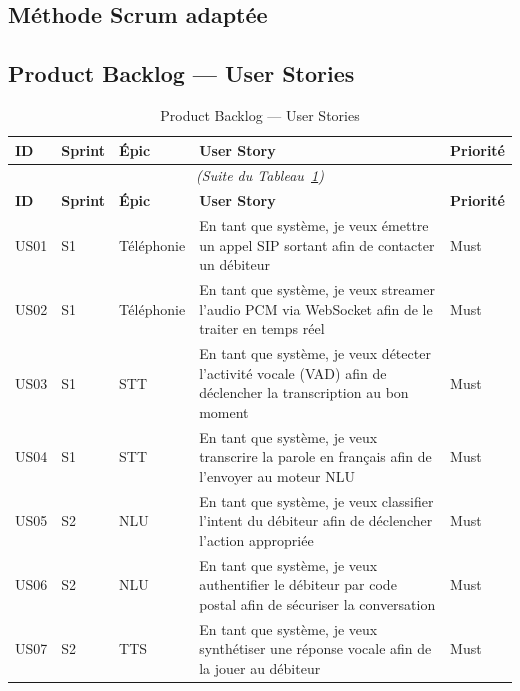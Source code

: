 \subsection{Méthode Scrum adaptée}


\subsection{Product Backlog — User Stories}


\begin{longtable}{lllp{6cm}l}
  \caption{Product Backlog — User Stories} \label{tab:backlog} \\
  \toprule
  \textbf{ID} & \textbf{Sprint} & \textbf{Épic} & \textbf{User Story} & \textbf{Priorité} \\
  \midrule
  \endfirsthead
  \multicolumn{5}{c}{\textit{(Suite du Tableau~\ref{tab:backlog})}} \\
  \toprule
  \textbf{ID} & \textbf{Sprint} & \textbf{Épic} & \textbf{User Story} & \textbf{Priorité} \\
  \midrule
  \endhead
  \bottomrule
  \endfoot
  US01 & S1 & Téléphonie  & En tant que système, je veux émettre un appel SIP sortant afin de contacter un débiteur & Must \\
  US02 & S1 & Téléphonie  & En tant que système, je veux streamer l'audio PCM via WebSocket afin de le traiter en temps réel & Must \\
  US03 & S1 & STT         & En tant que système, je veux détecter l'activité vocale (VAD) afin de déclencher la transcription au bon moment & Must \\
  US04 & S1 & STT         & En tant que système, je veux transcrire la parole en français afin de l'envoyer au moteur NLU & Must \\
  US05 & S2 & NLU         & En tant que système, je veux classifier l'intent du débiteur afin de déclencher l'action appropriée & Must \\
  US06 & S2 & NLU         & En tant que système, je veux authentifier le débiteur par code postal afin de sécuriser la conversation & Must \\
  US07 & S2 & TTS         & En tant que système, je veux synthétiser une réponse vocale afin de la jouer au débiteur & Must \\

\end{longtable}
